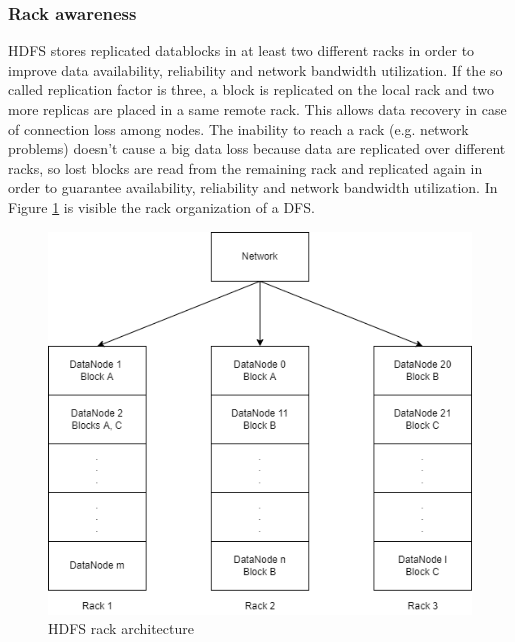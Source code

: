 \documentclass[\main/main.tex]{subfiles}
\begin{document}
\subsubsection{Rack awareness} HDFS stores replicated datablocks in at least two different racks in order to improve data availability, reliability and network bandwidth utilization. If the so called replication factor is three, a block is replicated on the local rack and two more replicas are placed in a same remote rack. This allows data recovery in case of connection loss among nodes. The inability to reach a rack (e.g. network problems) doesn't cause a big data loss because data are replicated over different racks, so lost blocks are read from the remaining rack and replicated again in order to guarantee availability, reliability and network bandwidth utilization. In Figure \ref{fig:racks_dfs} is visible the rack organization of a DFS.
\begin{figure}[H]
    \centering
    \includegraphics[scale=.6]{images/cluster_computing/racks_dfs.png}
    \caption{HDFS rack architecture}
    \label{fig:racks_dfs}
\end{figure}
\end{document}
